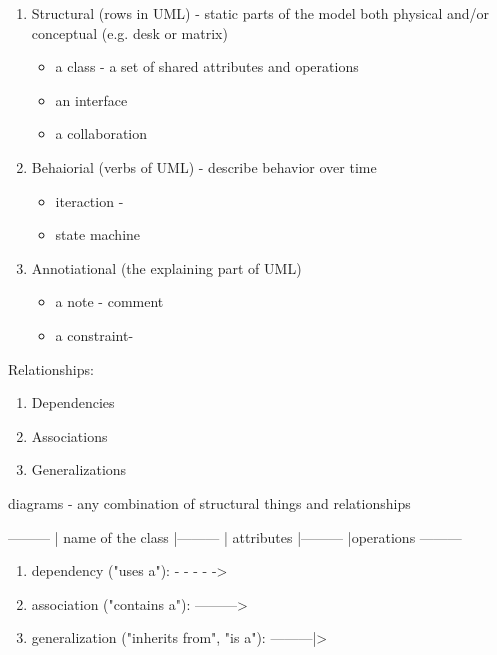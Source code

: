 \begin{enumerate}
  \item Structural (rows in UML) - static parts of the model both physical and/or conceptual (e.g. desk or matrix)
  \begin{itemize}
    \item a class - a set of shared attributes and operations 
    \item an interface
    \item a collaboration
  \end{itemize}
  \item Behaiorial (verbs of UML) - describe behavior over time
  \begin{itemize}
    \item iteraction -
    \item state machine
  \end{itemize}
  \item Annotiational (the explaining part of UML)
  \begin{itemize}
    \item a note - comment
    \item a constraint-
  \end{itemize}
\end{enumerate}

Relationships:

\begin{enumerate}
  \item Dependencies
  \item Associations
  \item Generalizations
\end{enumerate}

diagrams - any combination of structural things and relationships

---------
| name of the class
|---------
| attributes
|---------
|operations
---------

\begin{enumerate}
  \item dependency ("uses a"):  - - - - ->
  \item association ("contains a"):  --------->
  \item generalization ("inherits from", "is a"): ---------|> 
\end{enumerate}

